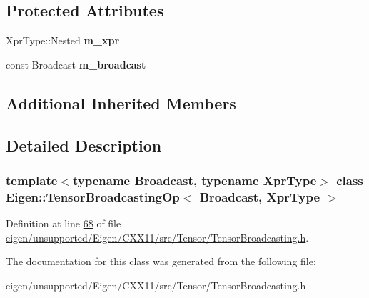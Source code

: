 \subsection*{Protected Attributes}
\begin{DoxyCompactItemize}
\item 
\mbox{\label{class_eigen_1_1_tensor_broadcasting_op_ad0cc032b67926f5e9a6e9229c3a677f5}} 
Xpr\+Type\+::\+Nested {\bfseries m\+\_\+xpr}
\item 
\mbox{\label{class_eigen_1_1_tensor_broadcasting_op_a8dfdf9a4ca604ecb5c64ae98fbc9fb1d}} 
const Broadcast {\bfseries m\+\_\+broadcast}
\end{DoxyCompactItemize}
\subsection*{Additional Inherited Members}


\subsection{Detailed Description}
\subsubsection*{template$<$typename Broadcast, typename Xpr\+Type$>$\newline
class Eigen\+::\+Tensor\+Broadcasting\+Op$<$ Broadcast, Xpr\+Type $>$}



Definition at line \hyperlink{eigen_2unsupported_2_eigen_2_c_x_x11_2src_2_tensor_2_tensor_broadcasting_8h_source_l00068}{68} of file \hyperlink{eigen_2unsupported_2_eigen_2_c_x_x11_2src_2_tensor_2_tensor_broadcasting_8h_source}{eigen/unsupported/\+Eigen/\+C\+X\+X11/src/\+Tensor/\+Tensor\+Broadcasting.\+h}.



The documentation for this class was generated from the following file\+:\begin{DoxyCompactItemize}
\item 
eigen/unsupported/\+Eigen/\+C\+X\+X11/src/\+Tensor/\+Tensor\+Broadcasting.\+h\end{DoxyCompactItemize}

